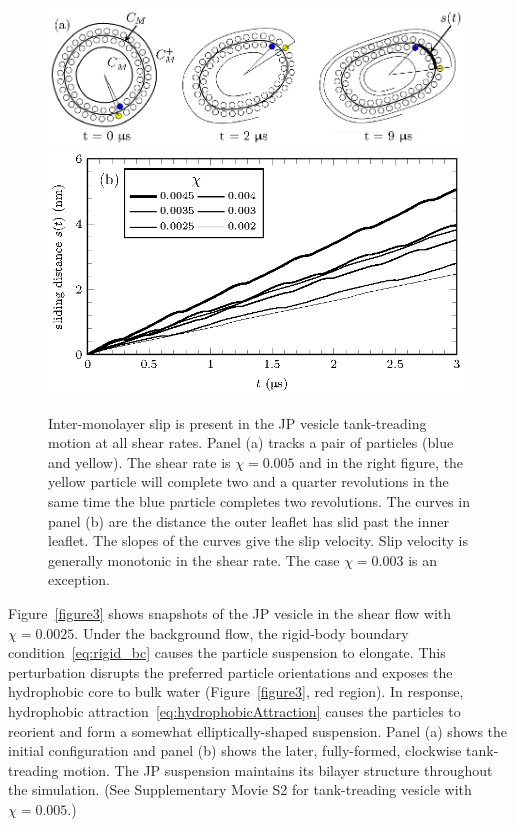 \documentclass[lineno]{jfm}
\begin{document}
\begin{figure}
\begin{center}
  \includegraphics[width=11cm]{fig4a.eps}\\
  \includegraphics[width=11cm]{fig4b.eps}
\end{center} 
\caption{\label{figure5} Inter-monolayer slip is present in the JP
  vesicle tank-treading motion at all shear rates. Panel (a) tracks a
  pair of particles (blue and yellow). The shear rate is $\chi=0.005$
  and in the right figure, the yellow particle will complete two and a
  quarter revolutions in the same time the blue particle completes two
  revolutions. The curves in panel (b) are the distance the outer
  leaflet has slid past the inner leaflet. The slopes of the curves
  give the slip velocity. 
  Slip velocity is generally monotonic in the shear rate.
  The case $\chi = 0.003$ is an exception.}
\end{figure}

Figure~\ref{figure3} shows snapshots of the JP vesicle in the shear flow
with $\chi=0.0025$. Under the background flow, the rigid-body boundary
condition~\eqref{eq:rigid_bc} causes the particle suspension to
elongate. This perturbation disrupts the preferred particle orientations
and exposes the hydrophobic core to bulk water (Figure~\ref{figure3},
red region). In response, hydrophobic
attraction~\eqref{eq:hydrophobicAttraction} causes the particles to
reorient and form a somewhat elliptically-shaped suspension. Panel (a)
shows the initial configuration and panel (b) shows the later,
fully-formed, clockwise tank-treading motion. The JP suspension
maintains its bilayer structure throughout the simulation. 
(See Supplementary Movie S2 for tank-treading vesicle with $\chi=0.005$.)
%
\end{document}
